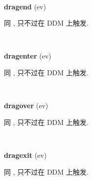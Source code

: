 \documentclass[letterpaper,10pt,english]{sphinxmanual}
\begin{document}

\begin{fulllineitems}
\label{api/component/dd/ddm:DDM.dragend}~
\begin{DUlineblock}{0em}
\item[] \textbf{dragend} (ev)
\item[] 同 {\hyperref[api/component/dd/draggable:Draggable.dragend]{}} , 只不过在 DDM 上触发.
\end{DUlineblock}

\end{fulllineitems}



\begin{fulllineitems}
\label{api/component/dd/ddm:DDM.dragenter}~
\begin{DUlineblock}{0em}
\item[] \textbf{dragenter} (ev)
\item[] 同 {\hyperref[api/component/dd/draggable:Draggable.dragenter]{}} , 只不过在 DDM 上触发.
\end{DUlineblock}

\end{fulllineitems}



\begin{fulllineitems}
\label{api/component/dd/ddm:DDM.dragover}~
\begin{DUlineblock}{0em}
\item[] \textbf{dragover} (ev)
\item[] 同 {\hyperref[api/component/dd/draggable:Draggable.dragover]{}} , 只不过在 DDM 上触发.
\end{DUlineblock}

\end{fulllineitems}



\begin{fulllineitems}
\label{api/component/dd/ddm:DDM.dragexit}~
\begin{DUlineblock}{0em}
\item[] \textbf{dragexit} (ev)
\item[] 同 {\hyperref[api/component/dd/draggable:Draggable.dragexit]{}} , 只不过在 DDM 上触发.
\end{DUlineblock}

\end{fulllineitems}
\end{document}
